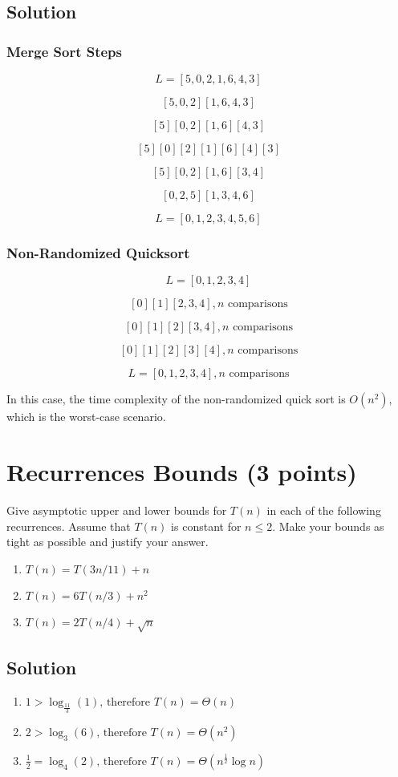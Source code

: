 \documentclass[letter,11pt]{article}
\begin{document}
\subsection{Solution}

\subsubsection{Merge Sort Steps}

\[ L = [5, 0, 2, 1, 6, 4, 3] \]

\[ [5, 0, 2] [1, 6, 4, 3] \]

\[ [5] [0, 2] [1, 6] [4, 3] \]

\[ [5] [0] [2] [1] [6] [4] [3] \]

\[ [5] [0, 2] [1, 6] [3, 4] \]

\[ [0, 2, 5] [1, 3, 4, 6] \]

\[ L = [0, 1, 2, 3, 4, 5, 6] \]

\subsubsection{Non-Randomized Quicksort}

\[ L = [0, 1, 2, 3, 4] \]

\[ [0] [1] [2, 3, 4], n\text{ comparisons}\]

\[ [0] [1] [2] [3, 4], n\text{ comparisons}\]

\[ [0] [1] [2] [3] [4], n\text{ comparisons}\]

\[ L = [0, 1, 2, 3, 4], n\text{ comparisons}\]

In this case, the time complexity of the non-randomized quick sort is $O(n^2)$, which is the worst-case scenario.








\section{Recurrences Bounds (3 points)}

Give asymptotic upper and lower bounds for $T(n)$ in each of the following recurrences.  Assume that $T(n)$ is constant for $n \le 2$.  Make your bounds as tight as possible and justify your answer.

\begin{enumerate}
\item $T(n) = T(3n/11) + n $
\item $T(n) = 6T(n/3) + n^2 $
\item $T(n) = 2T(n/4) + \sqrt{n} $
\end{enumerate}

\subsection{Solution}

\begin{enumerate}
\item $1 > \log_{\frac{11}{3}}(1)\text{, therefore } T(n) = \Theta(n)$
\item $2 > \log_3(6)\text{, therefore } T(n) = \Theta(n^2)$
\item $\frac{1}{2} = \log_4(2)\text{, therefore } T(n) = \Theta({n^{\frac{1}{2}}\log n})$
\end{enumerate}
  
\end{document}
